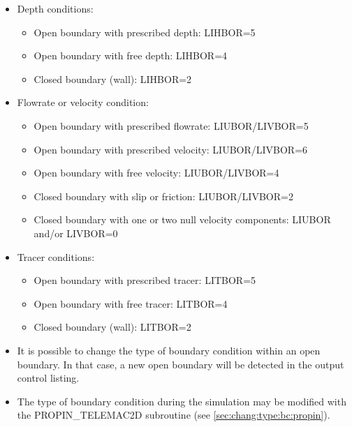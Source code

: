 \begin{itemize}
\item  Depth conditions:

\begin{itemize}

 \item Open boundary with prescribed depth: LIHBOR=5

 \item Open boundary with free depth: LIHBOR=4

 \item Closed boundary (wall): LIHBOR=2
\end{itemize}

\item  Flowrate or velocity condition:

\begin{itemize}

\item Open boundary with prescribed flowrate: LIUBOR/LIVBOR=5

\item Open boundary with prescribed velocity: LIUBOR/LIVBOR=6

\item Open boundary with free velocity: LIUBOR/LIVBOR=4

\item Closed boundary with slip or friction: LIUBOR/LIVBOR=2

\item Closed boundary with one or two null velocity components: LIUBOR and/or LIVBOR=0
\end{itemize}

\item  Tracer conditions:

\begin{itemize}

\item Open boundary with prescribed tracer: LITBOR=5

\item Open boundary with free tracer: LITBOR=4

\item Closed boundary (wall): LITBOR=2
\end{itemize}

\end{itemize}

\begin{itemize}
\item It is possible to change the type of boundary condition within an open boundary. In that case, a new open boundary will be detected in the output control listing.

\item  The type of boundary condition during the simulation may be modified with the PROPIN\_TELEMAC2D subroutine (see \ref{sec:chang:type:bc:propin}).
\end{itemize}



